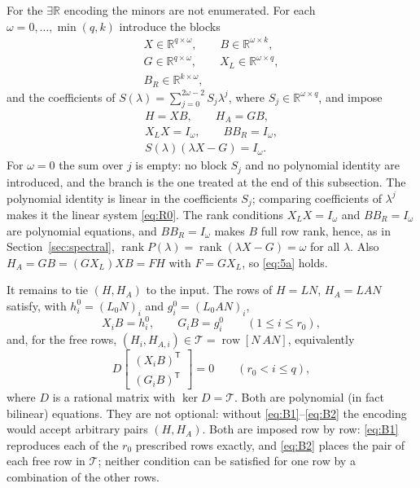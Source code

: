 \documentclass[journal]{IEEEtran}
\theoremstyle{plainn}
\theoremstyle{remark}
\begin{document}
For the $\exists\mathbb R$ encoding the minors are not enumerated. For each $\omega=0,\dots,\min(q,k)$ introduce the blocks
\begin{equation*}
\begin{gathered}
X\in\mathbb R^{q\times\omega},\qquad B\in\mathbb R^{\omega\times k},\\
G\in\mathbb R^{q\times\omega},\qquad X_L\in\mathbb R^{\omega\times q},\\
B_R\in\mathbb R^{k\times\omega},
\end{gathered}
\end{equation*}
and the coefficients of $S(\lambda)=\sum_{j=0}^{2\omega-2}S_j\lambda^j$, where $S_j\in\mathbb R^{\omega\times q}$, and impose
\begin{equation*}
\begin{gathered}
H=XB,\qquad H_A=GB,\\
X_LX=I_\omega,\qquad BB_R=I_\omega,\\
S(\lambda)(\lambda X-G)=I_\omega .
\end{gathered}
\end{equation*}
For $\omega=0$ the sum over $j$ is empty: no block $S_j$ and no polynomial identity are introduced, and
the branch is the one treated at the end of this subsection.
The polynomial identity is linear in the coefficients $S_j$; comparing coefficients of $\lambda^j$ makes it the linear system \eqref{eq:R0}. The rank conditions $X_LX=I_\omega$ and $BB_R=I_\omega$ are polynomial equations, and $BB_R=I_\omega$ makes $B$ full row rank, hence, as in Section~\ref{sec:spectral}, $\operatorname{rank}P(\lambda)=\operatorname{rank}(\lambda X-G)=\omega$ for all $\lambda$. Also $H_A=GB=(GX_L)XB=FH$ with $F=GX_L$, so \eqref{eq:5a} holds.

It remains to tie $(H,H_A)$ to the input. The rows of $H=LN$, $H_A=LAN$ satisfy, with $h_i^0=(L_0N)_i$ and $g_i^0=(L_0AN)_i$,
\begin{equation}
X_iB=h_i^0,\qquad G_iB=g_i^0\qquad(1\le i\le r_0),\label{eq:B1}
\end{equation}
and, for the free rows, $(H_i,H_{A,i})\in\mathcal T=\operatorname{row}[N\ AN]$, equivalently
\begin{equation}
D\begin{bmatrix}(X_iB)^{\mathsf T}\\ (G_iB)^{\mathsf T}\end{bmatrix}=0
\qquad(r_0<i\le q),\label{eq:B2}
\end{equation}
where $D$ is a rational matrix with $\ker D=\mathcal T$. Both are polynomial (in fact bilinear) equations. They are not optional: without \eqref{eq:B1}--\eqref{eq:B2} the encoding would accept arbitrary pairs
$(H,H_A)$. Both are imposed row by row: \eqref{eq:B1} reproduces each of the $r_0$ prescribed rows
exactly, and \eqref{eq:B2} places the pair of each free row in $\mathcal T$; neither condition can be
satisfied for one row by a combination of the other rows.
\end{document}
